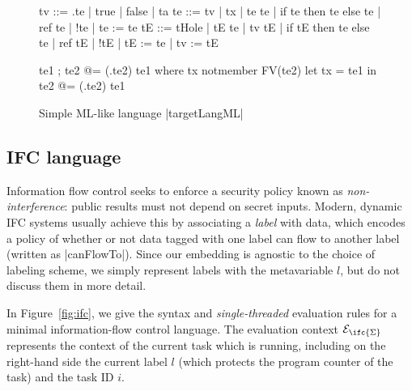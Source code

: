 \begin{figure}
\begin{code}
tv   ::= \tx.te | true | false | ta
te   ::= tv | tx | te te | if te then te else te | ref te | !te | te := te
tE   ::= tHole | tE te | tv tE | if tE then te else te
       | ref tE | !tE | tE := te | tv := tE 

te1 ; te2            @= (\tx.te2) te1  where  tx notmember FV(te2)
let tx = te1 in te2  @= (\tx.te2) te1
\end{code}


\caption{Simple ML-like language |targetLangML|}
\label{fig:ml}
\end{figure}

\subsection{IFC language}

Information flow control seeks to enforce a security policy known as
\emph{non-interference}: public results must not depend on secret inputs.
Modern, dynamic IFC systems usually achieve this by associating a \emph{label}
with data, which encodes a policy of whether or not data tagged with one
label can flow to another label (written as |canFlowTo|).
Since our embedding is agnostic
to the choice of labeling scheme, we simply represent labels with the metavariable
$l$, but do not discuss them in more detail.

In Figure~\ref{fig:ifc}, we give the syntax and \emph{single-threaded}
evaluation rules for a minimal information-flow control language.  The
evaluation context $\mathcal{E}_{\ifc{\Sigma}}$ represents the context
of the current task which is running, including on the right-hand side
the current label $l$ (which protects the program counter of the task)
and the task ID $i$.

